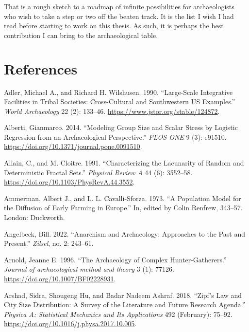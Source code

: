 \documentclass[
  12pt,
  a4paper, twoside]{book}
\newlength{\cslhangindent}
\newlength{\cslentryspacingunit} %
\newenvironment{CSLReferences}[2] %
 {%
  \setlength{\parindent}{0pt}
  \ifodd #1
  \let\oldpar\par
  \def\par{\hangindent=\cslhangindent\oldpar}
  \fi
  \setlength{\parskip}{#2\cslentryspacingunit}
 }%
 {}
\begin{document}
That is a rough sketch to a roadmap of infinite possibilities for archaeologists who wish to take a step or two off the beaten track. It is the list I wish I had read before starting to work on this thesis. As such, it is perhaps the best contribution I can bring to the archaeological table.

\pagestyle{plain}

\hypertarget{refs}{}
\begin{CSLReferences}{1}{0}
\hypertarget{references}{%
\chapter*{References}\label{references}}

\leavevmode{}%
Adler, Michael A., and Richard H. Wilshusen. 1990. {``Large-Scale Integrative Facilities in Tribal Societies: Cross-Cultural and Southwestern US Examples.''} \emph{World Archaeology} 22 (2): 133--46. \url{https://www.jstor.org/stable/124872}.

\leavevmode{}%
Alberti, Gianmarco. 2014. {``Modeling Group Size and Scalar Stress by Logistic Regression from an Archaeological Perspective.''} \emph{PLOS ONE} 9 (3): e91510. \url{https://doi.org/10.1371/journal.pone.0091510}.

\leavevmode{}%
Allain, C., and M. Cloitre. 1991. {``Characterizing the Lacunarity of Random and Deterministic Fractal Sets.''} \emph{Physical Review A} 44 (6): 3552--58. \url{https://doi.org/10.1103/PhysRevA.44.3552}.

\leavevmode{}%
Ammerman, Albert J., and L. L. Cavalli-Sforza. 1973. {``A Population Model for the Diffusion of Early Farming in Europe.''} In, edited by Colin Renfrew, 343--57. London: Duckworth.

\leavevmode{}%
Angelbeck, Bill. 2022. {``Anarchism and Archaeology: Approaches to the Past and Present.''} \emph{Zilsel}, no. 2: 243--61.

\leavevmode{}%
Arnold, Jeanne E. 1996. {``The Archaeology of Complex Hunter-Gatherers.''} \emph{Journal of archaeological method and theory} 3 (1): 77126. \url{https://doi.org/10.1007/BF02228931}.

\leavevmode{}%
Arshad, Sidra, Shougeng Hu, and Badar Nadeem Ashraf. 2018. {``Zipf{'}s Law and City Size Distribution: A Survey of the Literature and Future Research Agenda.''} \emph{Physica A: Statistical Mechanics and Its Applications} 492 (February): 75--92. \url{https://doi.org/10.1016/j.physa.2017.10.005}.


\end{CSLReferences}
\end{document}
